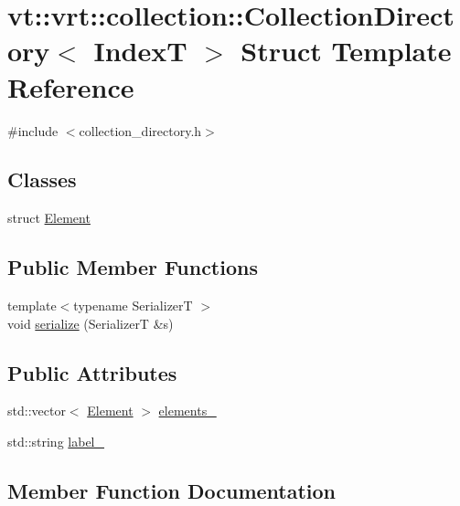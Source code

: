 \hypertarget{structvt_1_1vrt_1_1collection_1_1_collection_directory}{}\section{vt\+:\+:vrt\+:\+:collection\+:\+:Collection\+Directory$<$ IndexT $>$ Struct Template Reference}
\label{structvt_1_1vrt_1_1collection_1_1_collection_directory}


{\ttfamily \#include $<$collection\+\_\+directory.\+h$>$}

\subsection*{Classes}
\begin{DoxyCompactItemize}
\item 
struct \hyperlink{structvt_1_1vrt_1_1collection_1_1_collection_directory_1_1_element}{Element}
\end{DoxyCompactItemize}
\subsection*{Public Member Functions}
\begin{DoxyCompactItemize}
\item 
{\footnotesize template$<$typename SerializerT $>$ }\\void \hyperlink{structvt_1_1vrt_1_1collection_1_1_collection_directory_ac1bf905eb2f877598cbf2b6f7035a402}{serialize} (SerializerT \&s)
\end{DoxyCompactItemize}
\subsection*{Public Attributes}
\begin{DoxyCompactItemize}
\item 
std\+::vector$<$ \hyperlink{structvt_1_1vrt_1_1collection_1_1_collection_directory_1_1_element}{Element} $>$ \hyperlink{structvt_1_1vrt_1_1collection_1_1_collection_directory_abd9de4d084eb8cf4206c4729af70f734}{elements\+\_\+}
\item 
std\+::string \hyperlink{structvt_1_1vrt_1_1collection_1_1_collection_directory_a1d475a0d988698b91aaaabef7bb5c452}{label\+\_\+}
\end{DoxyCompactItemize}


\subsection{Member Function Documentation}
\mbox{\label{structvt_1_1vrt_1_1collection_1_1_collection_directory_ac1bf905eb2f877598cbf2b6f7035a402}} 

